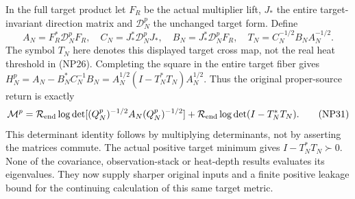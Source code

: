 \documentclass[11pt]{article}
\begin{document}
In the full target product let $F_R$ be the actual multiplier lift,
$J_*$ the entire target-invariant direction matrix and $\mathcal D_N^p$
the unchanged target form. Define
\[
 A_N=F_R^*\mathcal D_N^pF_R,\quad
 C_N=J_*^*\mathcal D_N^pJ_*,\quad
 B_N=J_*^*\mathcal D_N^pF_R,\quad T_N=C_N^{-1/2}B_NA_N^{-1/2}.
 \tag{NP30}
\]
The symbol $T_N$ here denotes this displayed target cross map, not the
real heat threshold in (NP26). Completing the square in the entire
target fiber gives
$H_N^p=A_N-B_N^*C_N^{-1}B_N
=A_N^{1/2}(I-T_N^*T_N)A_N^{1/2}$.
Thus the original proper-source return is exactly
\[
 \mathcal M^p=\mathcal R_{\rm end}\log\det[(Q_N^p)^{-1/2}A_N(Q_N^p)^{-1/2}]
       +\mathcal R_{\rm end}\log\det(I-T_N^*T_N). \tag{NP31}
\]
This determinant identity follows by multiplying determinants, not by
asserting the matrices commute. The actual positive target minimum
gives $I-T_N^*T_N\succ0$. None of the covariance, observation-stack
or heat-depth results evaluates its eigenvalues. They now supply
sharper original inputs and a finite positive leakage bound for the
continuing calculation of this same target metric.
\end{document}
